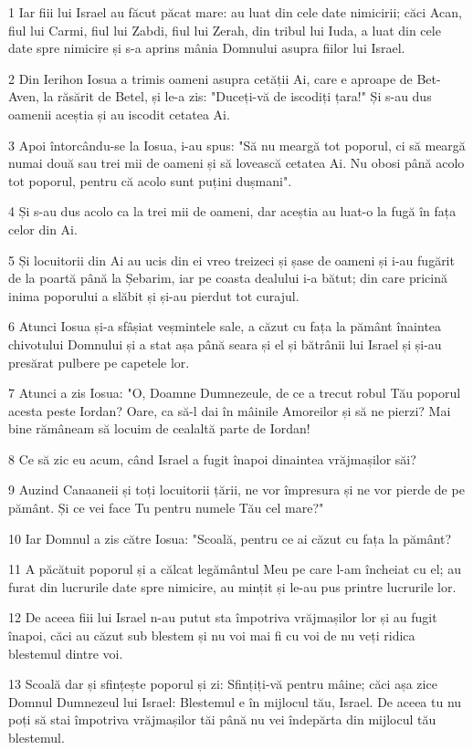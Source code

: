 \par 1 Iar fiii lui Israel au făcut păcat mare: au luat din cele date nimicirii; căci Acan, fiul lui Carmi, fiul lui Zabdi, fiul lui Zerah, din tribul lui Iuda, a luat din cele date spre nimicire și s-a aprins mânia Domnului asupra fiilor lui Israel.
\par 2 Din Ierihon Iosua a trimis oameni asupra cetății Ai, care e aproape de Bet-Aven, la răsărit de Betel, și le-a zis: "Duceți-vă de iscodiți țara!" Și s-au dus oamenii aceștia și au iscodit cetatea Ai.
\par 3 Apoi întorcându-se la Iosua, i-au spus: "Să nu meargă tot poporul, ci să meargă numai două sau trei mii de oameni și să lovească cetatea Ai. Nu obosi până acolo tot poporul, pentru că acolo sunt puțini dușmani".
\par 4 Și s-au dus acolo ca la trei mii de oameni, dar aceștia au luat-o la fugă în fața celor din Ai.
\par 5 Și locuitorii din Ai au ucis din ei vreo treizeci și șase de oameni și i-au fugărit de la poartă până la Șebarim, iar pe coasta dealului i-a bătut; din care pricină inima poporului a slăbit și și-au pierdut tot curajul.
\par 6 Atunci Iosua și-a sfâșiat veșmintele sale, a căzut cu fața la pământ înaintea chivotului Domnului și a stat așa până seara și el și bătrânii lui Israel și și-au presărat pulbere pe capetele lor.
\par 7 Atunci a zis Iosua: "O, Doamne Dumnezeule, de ce a trecut robul Tău poporul acesta peste Iordan? Oare, ca să-l dai în mâinile Amoreilor și să ne pierzi? Mai bine rămâneam să locuim de cealaltă parte de Iordan!
\par 8 Ce să zic eu acum, când Israel a fugit înapoi dinaintea vrăjmașilor săi?
\par 9 Auzind Canaaneii și toți locuitorii țării, ne vor împresura și ne vor pierde de pe pământ. Și ce vei face Tu pentru numele Tău cel mare?"
\par 10 Iar Domnul a zis către Iosua: "Scoală, pentru ce ai căzut cu fața la pământ?
\par 11 A păcătuit poporul și a călcat legământul Meu pe care l-am încheiat cu el; au furat din lucrurile date spre nimicire, au mințit și le-au pus printre lucrurile lor.
\par 12 De aceea fiii lui Israel n-au putut sta împotriva vrăjmașilor lor și au fugit înapoi, căci au căzut sub blestem și nu voi mai fi cu voi de nu veți ridica blestemul dintre voi.
\par 13 Scoală dar și sfințește poporul și zi: Sfințiți-vă pentru mâine; căci așa zice Domnul Dumnezeul lui Israel: Blestemul e în mijlocul tău, Israel. De aceea tu nu poți să stai împotriva vrăjmașilor tăi până nu vei îndepărta din mijlocul tău blestemul.
